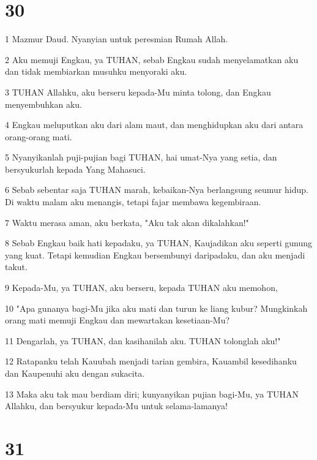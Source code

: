 \chapter{30}

\par 1 Mazmur Daud. Nyanyian untuk peresmian Rumah Allah.
\par 2 Aku memuji Engkau, ya TUHAN, sebab Engkau sudah menyelamatkan aku dan tidak membiarkan musuhku menyoraki aku.
\par 3 TUHAN Allahku, aku berseru kepada-Mu minta tolong, dan Engkau menyembuhkan aku.
\par 4 Engkau meluputkan aku dari alam maut, dan menghidupkan aku dari antara orang-orang mati.
\par 5 Nyanyikanlah puji-pujian bagi TUHAN, hai umat-Nya yang setia, dan bersyukurlah kepada Yang Mahasuci.
\par 6 Sebab sebentar saja TUHAN marah, kebaikan-Nya berlangsung seumur hidup. Di waktu malam aku menangis, tetapi fajar membawa kegembiraan.
\par 7 Waktu merasa aman, aku berkata, "Aku tak akan dikalahkan!"
\par 8 Sebab Engkau baik hati kepadaku, ya TUHAN, Kaujadikan aku seperti gunung yang kuat. Tetapi kemudian Engkau bersembunyi daripadaku, dan aku menjadi takut.
\par 9 Kepada-Mu, ya TUHAN, aku berseru, kepada TUHAN aku memohon,
\par 10 "Apa gunanya bagi-Mu jika aku mati dan turun ke liang kubur? Mungkinkah orang mati memuji Engkau dan mewartakan kesetiaan-Mu?
\par 11 Dengarlah, ya TUHAN, dan kasihanilah aku. TUHAN tolonglah aku!"
\par 12 Ratapanku telah Kauubah menjadi tarian gembira, Kauambil kesedihanku dan Kaupenuhi aku dengan sukacita.
\par 13 Maka aku tak mau berdiam diri; kunyanyikan pujian bagi-Mu, ya TUHAN Allahku, dan bersyukur kepada-Mu untuk selama-lamanya!

\chapter{31}

